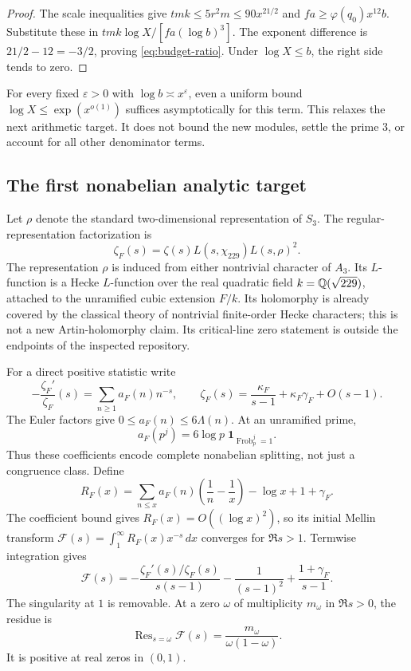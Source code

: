 \begin{proof}
The scale inequalities give $tmk\le5r^2m\le90x^{21/2}$ and $fa\ge\varphi(q_0)x^{12}b$. Substitute these in $tmk\log X/[fa(\log b)^3]$. The exponent difference is $21/2-12=-3/2$, proving \eqref{eq:budget-ratio}. Under $\log X\le b$, the right side tends to zero.
\end{proof}

For every fixed $\varepsilon>0$ with $\log b\asymp x^\varepsilon$, even a uniform bound $\log X\le\exp(x^{o(1)})$ suffices asymptotically for this term. This relaxes the next arithmetic target. It does not bound the new modules, settle the prime $3$, or account for all other denominator terms.

\subsection{The first nonabelian analytic target}

Let $\rho$ denote the standard two-dimensional representation of $S_3$. The regular-representation factorization is
\begin{equation}\label{eq:zeta-F}
 \zeta_F(s)=\zeta(s)L(s,\chi_{229})L(s,\rho)^2.
\end{equation}
The representation $\rho$ is induced from either nontrivial character of $A_3$. Its $L$-function is a Hecke $L$-function over the real quadratic field $k=\mathbb Q(\sqrt{229})$, attached to the unramified cubic extension $F/k$. Its holomorphy is already covered by the classical theory of nontrivial finite-order Hecke characters; this is not a new Artin-holomorphy claim. Its critical-line zero statement is outside the endpoints of the inspected repository.\cite{Milne,source}

For a direct positive statistic write
\[
 -\frac{\zeta_F'}{\zeta_F}(s)=\sum_{n\ge1}a_F(n)n^{-s},
 \qquad
 \zeta_F(s)=\frac{\kappa_F}{s-1}+\kappa_F\gamma_F+O(s-1).
\]
The Euler factors give $0\le a_F(n)\le6\Lambda(n)$. At an unramified prime,
\[
 a_F(p^j)=6\log p\;\mathbf1_{\operatorname{Frob}_p^j=1}.
\]
Thus these coefficients encode complete nonabelian splitting, not just a congruence class. Define
\begin{equation}\label{eq:targetR}
 R_F(x)=\sum_{n\le x}a_F(n)\left(\frac1n-\frac1x\right)
 -\log x+1+\gamma_F.
\end{equation}
The coefficient bound gives $R_F(x)=O((\log x)^2)$, so its initial Mellin transform $\mathcal F(s)=\int_1^\infty R_F(x)x^{-s}\,dx$ converges for $\Re s>1$. Termwise integration gives
\begin{equation}\label{eq:target-transform}
 \mathcal F(s)=
 -\frac{\zeta_F'(s)/\zeta_F(s)}{s(s-1)}
 -\frac1{(s-1)^2}+\frac{1+\gamma_F}{s-1}.
\end{equation}
The singularity at $1$ is removable. At a zero $\omega$ of multiplicity $m_\omega$ in $\Re s>0$, the residue is
\[
 \operatorname{Res}_{s=\omega}\mathcal F(s)
 =\frac{m_\omega}{\omega(1-\omega)}.
\]
It is positive at real zeros in $(0,1)$.

